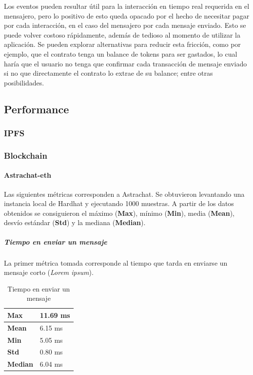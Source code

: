 Los eventos pueden resultar útil para la interacción en tiempo real requerida en el mensajero, pero lo positivo de esto queda opacado por el hecho de necesitar pagar por cada interacción, en el caso del mensajero por cada mensaje enviado. Esto se puede volver costoso rápidamente, además de tedioso al momento de utilizar la aplicación. Se pueden explorar alternativas para reducir esta fricción, como por ejemplo, que el contrato tenga un balance de tokens para ser gastados, lo cual haría que el usuario no tenga que confirmar cada transacción de mensaje enviado si no que directamente el contrato lo extrae de su balance; entre otras posibilidades.

\subsection{Performance}

\subsubsection{IPFS}

\subsubsection{Blockchain}

\paragraph{Astrachat-eth}

Las siguientes métricas corresponden a Astrachat. Se obtuvieron levantando una instancia local de Hardhat \cite{hardhat} y ejecutando 1000 muestras. A partir de los datos obtenidos se consiguieron el máximo (\textbf{Max}), mínimo (\textbf{Min}), media (\textbf{Mean}), desvío estándar (\textbf{Std}) y la mediana (\textbf{Median}).

\subparagraph{Tiempo en enviar un mensaje}

La primer métrica tomada corresponde al tiempo que tarda en enviarse un mensaje corto (\textit{Lorem ipsum}).

\setlength\tabcolsep{1pt}
\begin{table}[!htbp]
    \centering
    \begin{tabular}{|m{5em}|m{5em}|}
    \hline
    \textbf{Max} & 11.69 ms \\
    \hline
    \textbf{Mean} & 6.15 ms \\
    \hline
    \textbf{Min} & 5.05 ms \\
    \hline
    \textbf{Std} & 0.80 ms \\
    \hline
    \textbf{Median} & 6.04 ms \\
    \hline
    \end{tabular}
    \caption{Tiempo en enviar un mensaje}
\end{table}

